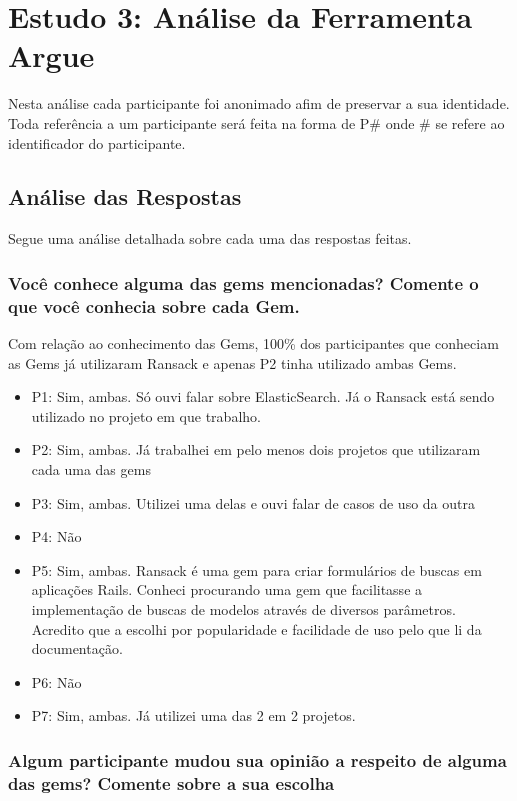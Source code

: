 \section{Estudo 3: Análise da Ferramenta Argue}

Nesta análise cada participante foi anonimado afim de preservar a sua identidade. Toda referência a um participante será feita na forma de P\# onde \# se refere ao identificador do participante.

\subsection{Análise das Respostas}

Segue uma análise detalhada sobre cada uma das respostas feitas.

\subsubsection{Você conhece alguma das gems mencionadas? Comente o que você conhecia sobre cada Gem.}

Com relação ao conhecimento das Gems, 100\% dos participantes que conheciam as Gems já utilizaram Ransack e apenas P2 tinha utilizado ambas Gems.

\begin{itemize}
  \item P1: Sim, ambas. Só ouvi falar sobre ElasticSearch. Já o Ransack está sendo utilizado no projeto em que trabalho.
  \item P2: Sim, ambas. Já trabalhei em pelo menos dois projetos que utilizaram cada uma das gems
  \item P3: Sim, ambas. Utilizei uma delas e ouvi falar de casos de uso da outra
  \item P4: Não
  \item P5: Sim, ambas. Ransack é uma gem para criar formulários de buscas em aplicações Rails. Conheci procurando uma gem que facilitasse a implementação de buscas de modelos através de diversos parâmetros. Acredito que a escolhi por popularidade e facilidade de uso pelo que li da documentação.
  \item P6: Não
  \item P7: Sim, ambas. Já utilizei uma das 2 em 2 projetos.
\end{itemize}

\subsubsection{Algum participante mudou sua opinião a respeito de alguma das gems? Comente sobre a sua escolha}

